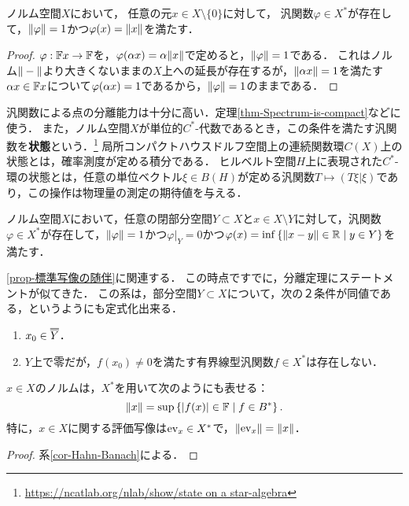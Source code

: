\documentclass[uplatex,dvipdfmx]{jsreport}
\begin{document}
\begin{corollary}[汎関数の構成]\label{cor-Hahn-Banach}
    ノルム空間$X$において，
    任意の元$x\in X\setminus\{0\}$に対して，
    汎関数$\varphi\in X^*$が存在して，$\|\varphi\|=1$かつ$\varphi(x)=\|x\|$を満たす．
\end{corollary}
\begin{proof}
    $\varphi:\mathbb{F} x\to\mathbb{F}$を，$\varphi(\alpha x)=\alpha\|x\|$で定めると，$\|\varphi\|=1$である．
    これはノルム$\|-\|$より大きくないままの$X$上への延長が存在するが，$\|\alpha x\|=1$を満たす$\alpha x\in\mathbb{F} x$について$\varphi(\alpha x)=1$であるから，$\|\varphi\|=1$のままである．
\end{proof}
\begin{remarks}[state]
    汎関数による点の分離能力は十分に高い．定理\ref{thm-Spectrum-is-compact}などに使う．
    また，ノルム空間$X$が単位的$C^*$-代数であるとき，この条件を満たす汎関数を\textbf{状態}という．\footnote{\url{https://ncatlab.org/nlab/show/state on a star-algebra}}
    局所コンパクトハウスドルフ空間上の連続関数環$C(X)$上の状態とは，確率測度が定める積分である．
    ヒルベルト空間$H$上に表現された$C^*$-環の状態とは，任意の単位ベクトル$\xi\in B(H)$が定める汎関数$T\mapsto(T\xi|\xi)$であり，この操作は物理量の測定の期待値を与える．
\end{remarks}

\begin{corollary}
    ノルム空間$X$において，任意の閉部分空間$Y\subset X$と$x\in X\setminus Y$に対して，汎関数$\varphi\in X^*$が存在して，$\|\varphi\|=1$かつ$\varphi|_Y=0$かつ$\varphi(x)=\inf\left\{\|x-y\|\in\mathbb{R}\mid y\in Y\right\}$を満たす．
\end{corollary}
\begin{remarks}
    \ref{prop-標準写像の随伴}に関連する．
    この時点ですでに，分離定理にステートメントが似てきた．
    この系は，部分空間$Y\subset X$について，次の２条件が同値である，というようにも定式化出来る．
    \begin{enumerate}
        \item $x_0\in \oo{Y}$．
        \item $Y$上で零だが，$f(x_0)\ne0$を満たす有界線型汎関数$f\in X^*$は存在しない．
    \end{enumerate}
\end{remarks}

\begin{corollary}
    $x\in X$のノルムは，$X^*$を用いて次のようにも表せる：
    \[\|x\|=\sup\left\{\lvert f(x)\rvert\in\mathbb{F}\mid f\in B^*\right\}.\]
    特に，$x\in X$に関する評価写像は$\mathrm{ev}_x\in X^*$で，$\|\mathrm{ev}_x\|=\|x\|$．
\end{corollary}
\begin{proof}
    系\ref{cor-Hahn-Banach}による．
\end{proof}
\end{document}
